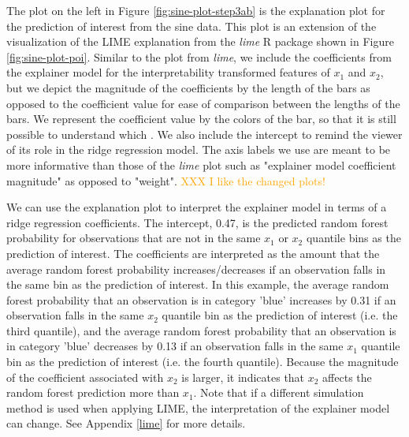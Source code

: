 \documentclass[AMS,STIX2COL]{WileyNJD-v2}\usepackage[]{graphicx}\usepackage[]{color}
\newcommand{\hh}[1]{\textcolor{orange}{#1}}
\newcommand{\data}{sine data}
\begin{document}
{The plot on the left in Figure \ref{fig:sine-plot-step3ab} is the explanation plot for the prediction of interest from the \data. This plot is an extension of the visualization of the LIME explanation from the \emph{lime} R package shown in Figure \ref{fig:sine-plot-poi}. Similar to the plot from \emph{lime}, we include the coefficients from the explainer model for the interpretability transformed features of $x_1$ and $x_2$, but we depict the magnitude of the coefficients by the length of the bars as opposed to the coefficient value for ease of comparison between the lengths of the bars. We represent the coefficient value by the colors of the bar, so that it is still possible to understand which . We also include the intercept to remind the viewer of its role in the ridge regression model. The axis labels we use are meant to be more informative than those of the \emph{lime} plot such as "explainer model coefficient magnitude" as opposed to "weight". \hh{XXX I like the changed plots!}

We can use the explanation plot to interpret the explainer model in terms of a ridge regression coefficients. The intercept, 0.47, is the predicted random forest probability for observations that are not in the same $x_1$ or $x_2$ quantile bins as the prediction of interest. The coefficients are interpreted as the amount that the average random forest probability increases/decreases if an observation falls in the same bin as the prediction of interest. In this example, the average random forest probability that an observation is in category 'blue' increases by 0.31 if an observation falls in the same $x_2$ quantile bin as the prediction of interest (i.e. the third quantile), and the average random forest probability that an observation is in category 'blue' decreases by 0.13 if an observation falls in the same $x_1$ quantile bin as the prediction of interest (i.e. the fourth quantile). Because the magnitude of the coefficient associated with $x_2$ is larger, it indicates that $x_2$ affects the random forest prediction more than $x_1$. Note that if a different simulation method is used when applying LIME, the interpretation of the explainer model can change. See Appendix \ref{lime} for more details.


}
\end{document}
